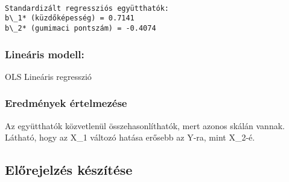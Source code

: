 \documentclass[11pt]{article}
\begin{document}
    \begin{Verbatim}[commandchars=\\\{\}]

Standardizált regressziós együtthatók:
b\_1* (küzdőképesség) = 0.7141
b\_2* (gumimaci pontszám) = -0.4074
    \end{Verbatim}

    \subsubsection{Lineáris modell:}\label{lineuxe1ris-modell}

OLS Lineáris regresszió

\subsubsection{Eredmények
értelmezése}\label{eredmuxe9nyek-uxe9rtelmezuxe9se}

Az együtthatók közvetlenül összehasonlíthatók, mert azonos skálán
vannak.\\
Látható, hogy az X\_1 változó hatása erősebb az Y-ra, mint X\_2-é.

    \subsection{Előrejelzés
készítése}\label{elux151rejelzuxe9s-kuxe9szuxedtuxe9se}
\end{document}
